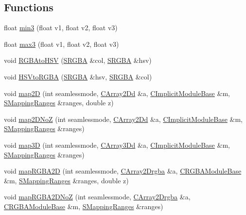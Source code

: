 \subsection*{Functions}
\begin{DoxyCompactItemize}
\item 
float \hyperlink{namespaceanl_a977bc8430a8d2d5ef7a2c66d9f91cc86}{min3} (float v1, float v2, float v3)
\item 
float \hyperlink{namespaceanl_ab6cc5977273479cbb6311b8cd5eb603e}{max3} (float v1, float v2, float v3)
\item 
void \hyperlink{namespaceanl_ac7feb7da75c2fe6eaf3b877a9fb6ac22}{RGBAtoHSV} (\hyperlink{structanl_1_1SRGBA}{SRGBA} \&col, \hyperlink{structanl_1_1SRGBA}{SRGBA} \&hsv)
\item 
void \hyperlink{namespaceanl_a976e18dba36a60b909fbce5ea118e1c9}{HSVtoRGBA} (\hyperlink{structanl_1_1SRGBA}{SRGBA} \&hsv, \hyperlink{structanl_1_1SRGBA}{SRGBA} \&col)
\item 
void \hyperlink{namespaceanl_a3d840e0e33cfc9405a1e53a11c1666ea}{map2D} (int seamlessmode, \hyperlink{classTArray2D}{CArray2Dd} \&a, \hyperlink{classanl_1_1CImplicitModuleBase}{CImplicitModuleBase} \&m, \hyperlink{structanl_1_1SMappingRanges}{SMappingRanges} \&ranges, double z)
\item 
void \hyperlink{namespaceanl_a99f38fb4a2dbc54ed805b5665fb76c91}{map2DNoZ} (int seamlessmode, \hyperlink{classTArray2D}{CArray2Dd} \&a, \hyperlink{classanl_1_1CImplicitModuleBase}{CImplicitModuleBase} \&m, \hyperlink{structanl_1_1SMappingRanges}{SMappingRanges} \&ranges)
\item 
void \hyperlink{namespaceanl_a3b9cec8b101907ef6fd902f040fbc6dd}{map3D} (int seamlessmode, \hyperlink{classTArray3D}{CArray3Dd} \&a, \hyperlink{classanl_1_1CImplicitModuleBase}{CImplicitModuleBase} \&m, \hyperlink{structanl_1_1SMappingRanges}{SMappingRanges} \&ranges)
\item 
void \hyperlink{namespaceanl_a3371cb5d5b55f78d610fd9e52586f2be}{mapRGBA2D} (int seamlessmode, \hyperlink{classTArray2D}{CArray2Drgba} \&a, \hyperlink{classanl_1_1CRGBAModuleBase}{CRGBAModuleBase} \&m, \hyperlink{structanl_1_1SMappingRanges}{SMappingRanges} \&ranges, double z)
\item 
void \hyperlink{namespaceanl_aa7bd5fe8cce5c826db1307de720396c5}{mapRGBA2DNoZ} (int seamlessmode, \hyperlink{classTArray2D}{CArray2Drgba} \&a, \hyperlink{classanl_1_1CRGBAModuleBase}{CRGBAModuleBase} \&m, \hyperlink{structanl_1_1SMappingRanges}{SMappingRanges} \&ranges)
\item 

\end{DoxyCompactItemize}
